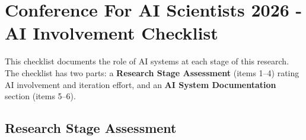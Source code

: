 \documentclass{article}
\begin{document}



\newpage

\section*{Conference For AI Scientists 2026 - AI Involvement Checklist}
\label{checklist_ai_involvement}

This checklist documents the role of AI systems at each stage of this research.
The checklist has two parts: a \textbf{Research Stage Assessment} (items 1--4) rating AI involvement and iteration effort, and an \textbf{AI System Documentation} section (items 5--6).

\subsection*{Research Stage Assessment}
\end{document}
